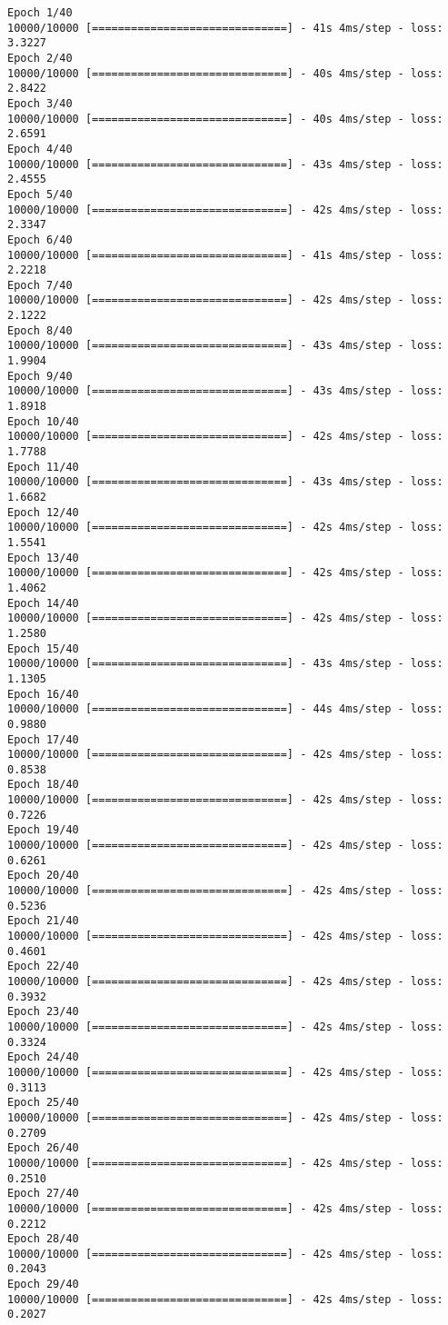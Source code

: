 \documentclass[11pt]{article}
\begin{document}
    \begin{Verbatim}[commandchars=\\\{\}]
Epoch 1/40
10000/10000 [==============================] - 41s 4ms/step - loss: 3.3227
Epoch 2/40
10000/10000 [==============================] - 40s 4ms/step - loss: 2.8422
Epoch 3/40
10000/10000 [==============================] - 40s 4ms/step - loss: 2.6591
Epoch 4/40
10000/10000 [==============================] - 43s 4ms/step - loss: 2.4555
Epoch 5/40
10000/10000 [==============================] - 42s 4ms/step - loss: 2.3347
Epoch 6/40
10000/10000 [==============================] - 41s 4ms/step - loss: 2.2218
Epoch 7/40
10000/10000 [==============================] - 42s 4ms/step - loss: 2.1222
Epoch 8/40
10000/10000 [==============================] - 43s 4ms/step - loss: 1.9904
Epoch 9/40
10000/10000 [==============================] - 43s 4ms/step - loss: 1.8918
Epoch 10/40
10000/10000 [==============================] - 42s 4ms/step - loss: 1.7788
Epoch 11/40
10000/10000 [==============================] - 43s 4ms/step - loss: 1.6682
Epoch 12/40
10000/10000 [==============================] - 42s 4ms/step - loss: 1.5541
Epoch 13/40
10000/10000 [==============================] - 42s 4ms/step - loss: 1.4062
Epoch 14/40
10000/10000 [==============================] - 42s 4ms/step - loss: 1.2580
Epoch 15/40
10000/10000 [==============================] - 43s 4ms/step - loss: 1.1305
Epoch 16/40
10000/10000 [==============================] - 44s 4ms/step - loss: 0.9880
Epoch 17/40
10000/10000 [==============================] - 42s 4ms/step - loss: 0.8538
Epoch 18/40
10000/10000 [==============================] - 42s 4ms/step - loss: 0.7226
Epoch 19/40
10000/10000 [==============================] - 42s 4ms/step - loss: 0.6261
Epoch 20/40
10000/10000 [==============================] - 42s 4ms/step - loss: 0.5236
Epoch 21/40
10000/10000 [==============================] - 42s 4ms/step - loss: 0.4601
Epoch 22/40
10000/10000 [==============================] - 42s 4ms/step - loss: 0.3932
Epoch 23/40
10000/10000 [==============================] - 42s 4ms/step - loss: 0.3324
Epoch 24/40
10000/10000 [==============================] - 42s 4ms/step - loss: 0.3113
Epoch 25/40
10000/10000 [==============================] - 42s 4ms/step - loss: 0.2709
Epoch 26/40
10000/10000 [==============================] - 42s 4ms/step - loss: 0.2510
Epoch 27/40
10000/10000 [==============================] - 42s 4ms/step - loss: 0.2212
Epoch 28/40
10000/10000 [==============================] - 42s 4ms/step - loss: 0.2043
Epoch 29/40
10000/10000 [==============================] - 42s 4ms/step - loss: 0.2027

\end{Verbatim}
\end{document}
